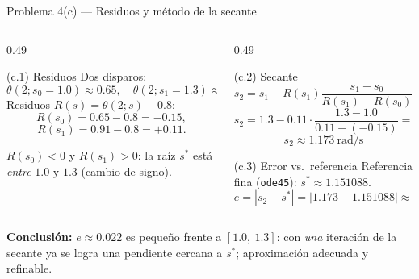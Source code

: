 \documentclass[aspectratio=169,10pt]{beamer}
\begin{document}
\begin{frame}{Problema 4(c) — Residuos y método de la secante}
\begin{columns}[T]
\begin{column}{0.49\textwidth}
\begin{cardgear}{(c.1) Residuos}{\faCalculator}
{\footnotesize Dos disparos:
\[
\theta(2;s_0{=}1.0)\approx0.65,\quad \theta(2;s_1{=}1.3)\approx0.91.
\]
Residuos $R(s)=\theta(2;s)-0.8$:
\[
R(s_0)=0.65-0.8=-0.15,
\]
\[
R(s_1)=0.91-0.8=+0.11.
\]}
\end{cardgear}
\vspace{1mm}
\begin{cardnota}[\faInfoCircle]
{\footnotesize $R(s_0)<0$ y $R(s_1)>0$: la raíz $s^*$ está \emph{entre} $1.0$ y $1.3$ (cambio de signo).}
\end{cardnota}
\end{column}
\begin{column}{0.49\textwidth}
\begin{cardgear}{(c.2) Secante}{\faSuperscript}
{\footnotesize
\[
s_2=s_1-R(s_1)\frac{s_1-s_0}{R(s_1)-R(s_0)}.
\]
\[
s_2=1.3-0.11\cdot\frac{1.3-1.0}{0.11-(-0.15)}=1.3-0.11\cdot\frac{0.3}{0.26}.
\]
\[
\boxed{\ s_2\approx1.173\ \text{rad/s}\ }
\]}
\end{cardgear}
\vspace{1mm}
\begin{cardgear}{(c.3) Error vs.\ referencia}{\faRulerHorizontal}
{\footnotesize Referencia fina (\texttt{ode45}): $s^*\approx1.151088$.
\[
e=|s_2-s^*|=|1.173-1.151088|\approx0.022\ \text{rad/s}.
\]}
\end{cardgear}
\end{column}
\end{columns}
\vspace{1mm}
\begin{cardnota}[\faCheckCircle]
{\footnotesize \textbf{Conclusión:} $e\approx0.022$ es pequeño frente a $[1.0,\ 1.3]$: con \emph{una} iteración de la secante ya se logra una pendiente cercana a $s^*$; aproximación adecuada y refinable.}
\end{cardnota}
\end{frame}
\end{document}
